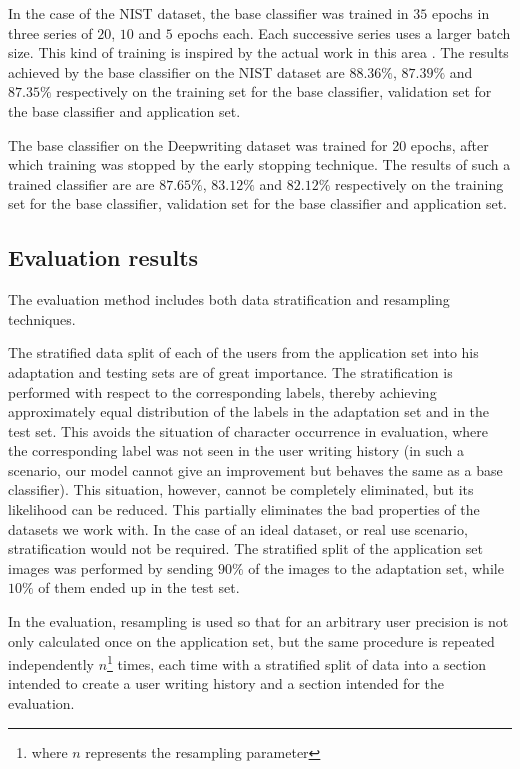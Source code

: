 \documentclass{article}
\begin{document}
In the case of the NIST dataset, the base classifier was trained in $35$ epochs in three series of $20$, $10$ and $5$ epochs each. 
Each successive series uses a larger batch size. 
This kind of training is inspired by the actual work in this area \citet{lrbs}. 
The results achieved by the base classifier on the NIST dataset are $88.36\%$, $87.39\%$ and $87.35\%$ respectively on the training set for the base classifier, validation set for the base classifier and application set. 

The base classifier on the Deepwriting dataset was trained for 20 epochs, after which training was stopped by the early stopping technique. 
The results of such a trained classifier are are $87.65\%$, $83.12\%$ and $82.12\%$ respectively on the training set for the base classifier, validation set for the base classifier and application set. 

\subsection{Evaluation results}

The evaluation method includes both data stratification and resampling techniques. 

The stratified data split of each of the users from the application set into his adaptation and testing sets are of great importance. 
The stratification is performed with respect to the corresponding labels, thereby achieving approximately equal distribution of the labels in the adaptation set and in the test set. 
This avoids the situation of character occurrence in evaluation, where the corresponding label was not seen in the user writing history 
(in such a scenario, our model cannot give an improvement but behaves the same as a base classifier). 
This situation, however, cannot be completely eliminated, but its likelihood can be reduced. 
This partially eliminates the bad properties of the datasets we work with. 
In the case of an ideal dataset, or real use scenario, stratification would not be required. 
The stratified split of the application set images was performed by sending $90\%$ of the images to the adaptation set, while $10\%$ of them ended up in the test set. 

In the evaluation, resampling is used so that for an arbitrary user precision is not only calculated once on the application set, but the same procedure is repeated 
independently $n$\footnote{where $n$ represents the resampling parameter} times, 
each time with a stratified split of data into a section intended to create a user writing history and a section intended for the evaluation.  
\end{document}

